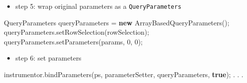 \documentclass[
]{book}
\newenvironment{Shaded}{\begin{snugshade}}{\end{snugshade}}
\newcommand{\DecValTok}[1]{\textcolor[rgb]{0.00,0.00,0.81}{#1}}
\newcommand{\FunctionTok}[1]{\textcolor[rgb]{0.00,0.00,0.00}{#1}}
\newcommand{\KeywordTok}[1]{\textcolor[rgb]{0.13,0.29,0.53}{\textbf{#1}}}
\newcommand{\NormalTok}[1]{#1}
\providecommand{\tightlist}{%
  \setlength{\itemsep}{0pt}\setlength{\parskip}{0pt}}
\begin{document}
\begin{itemize}
\tightlist
\item
  step 5: wrap original parameters as a \texttt{QueryParameters}
\end{itemize}

\begin{Shaded}
\begin{Highlighting}[]
\NormalTok{QueryParameters queryParameters = }\KeywordTok{new} \FunctionTok{ArrayBasedQueryParameters}\NormalTok{();}
\NormalTok{queryParameters.}\FunctionTok{setRowSelection}\NormalTok{(rowSelection);}
\NormalTok{queryParameters.}\FunctionTok{setParameters}\NormalTok{(params, }\DecValTok{0}\NormalTok{, }\DecValTok{0}\NormalTok{);}
\end{Highlighting}
\end{Shaded}

\begin{itemize}
\tightlist
\item
  step 6: set parameters
\end{itemize}

\begin{Shaded}
\begin{Highlighting}[]
\NormalTok{instrumentor.}\FunctionTok{bindParameters}\NormalTok{(ps, parameterSetter, queryParameters, }\KeywordTok{true}\NormalTok{);}
\NormalTok{. . .}
\end{Highlighting}
\end{Shaded}

  
\end{document}
